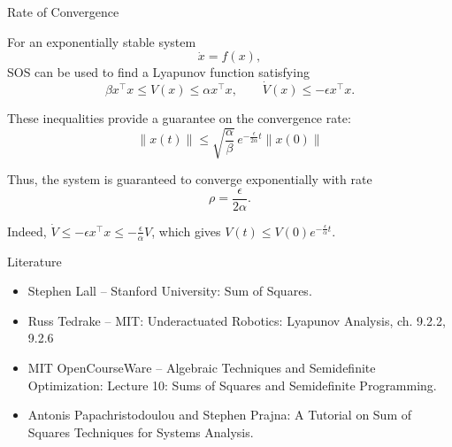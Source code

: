 \documentclass{beamer}
\begin{document}
\begin{frame}{Rate of Convergence}
	\begin{flushleft}
		For an exponentially stable system
		\[
		\dot{x}=f(x),
		\]
		SOS can be used to find a Lyapunov function satisfying
		\[
		\beta x^\top x
		\le V(x)\le
		\alpha x^\top x,
		\qquad
		\dot V(x)\le-\epsilon x^\top x.
		\]
		
		\bigskip
		
		These inequalities provide a guarantee on the convergence rate:
		\[
		\boxed{
			\|x(t)\|
			\le
			\sqrt{\frac{\alpha}{\beta}}\,
			e^{-\frac{\epsilon}{2\alpha}t}
			\|x(0)\|
		}
		\]
		
		Thus, the system is guaranteed to converge exponentially
		with rate
		\[
		\boxed{\rho=\frac{\epsilon}{2\alpha}}.
		\]
		
		\bigskip
		
		Indeed, $
		\dot V
		\le-\epsilon x^\top x
		\le-\frac{\epsilon}{\alpha}V
		$, 
		which gives
		$
		V(t)\le V(0)e^{-\frac{\epsilon}{\alpha}t}.
		$
	\end{flushleft}
\end{frame}


\begin{frame}{Literature}

\begin{itemize}
	
	\item Stephen Lall -- Stanford University:
	{Sum of Squares.}
	
		\item Russ Tedrake -- MIT:
	{Underactuated Robotics: Lyapunov Analysis, ch. 9.2.2, 9.2.6}
	
	\item MIT OpenCourseWare -- Algebraic Techniques and Semidefinite Optimization:
	{Lecture 10: Sums of Squares and Semidefinite Programming.}
	
	\item Antonis Papachristodoulou and Stephen Prajna:
	{A Tutorial on Sum of Squares Techniques for Systems Analysis.}
	
	
\end{itemize}

\end{frame}



\myqrframe
\end{document}
